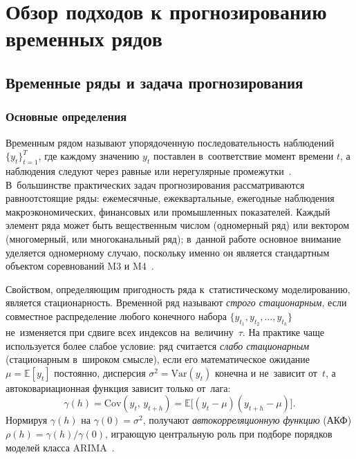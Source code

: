 
\section{Обзор подходов к прогнозированию временных рядов}
\label{sec:theory}

\subsection{Временные ряды и задача прогнозирования}
\label{subsec:ts-problem}

\subsubsection{Основные определения}
\label{sssec:ts-intro}

Временным рядом называют упорядоченную последовательность наблюдений
$\{y_t\}_{t=1}^{T}$, где каждому значению $y_t$ поставлен в~соответствие
момент времени $t$, а наблюдения следуют через равные или нерегулярные
промежутки~\cite{hamilton1994time}.  В~большинстве практических задач
прогнозирования рассматриваются равноотстоящие ряды: ежемесячные,
ежеквартальные, ежегодные наблюдения макроэкономических, финансовых или
промышленных показателей.  Каждый элемент ряда может быть вещественным
числом (одномерный ряд) или вектором (многомерный, или многоканальный
ряд); в~данной работе основное внимание уделяется одномерному случаю,
поскольку именно он является стандартным объектом соревнований M3 и
M4~\cite{makridakis2000m3, makridakis2020m4}.

Свойством, определяющим пригодность ряда к~статистическому
моделированию, является стационарность.  Временной ряд называют
\textit{строго стационарным}, если совместное распределение любого
конечного набора
$\{y_{t_1}, y_{t_2}, \ldots, y_{t_k}\}$
не~изменяется при сдвиге всех индексов на~величину~$\tau$.  На практике
чаще используется более слабое условие: ряд считается \textit{слабо
стационарным} (стационарным в~широком смысле), если его математическое
ожидание $\mu = \mathbb{E}[y_t]$ постоянно, дисперсия
$\sigma^2 = \mathrm{Var}(y_t)$ конечна и не~зависит от~$t$, а
автоковариационная функция зависит только от~лага:
\begin{equation}
\label{eq:autocovariance}
\gamma(h) = \mathrm{Cov}(y_t,\, y_{t+h}) = \mathbb{E}\bigl[(y_t - \mu)(y_{t+h} - \mu)\bigr].
\end{equation}
Нормируя $\gamma(h)$ на $\gamma(0) = \sigma^2$, получают
\textit{автокорреляционную функцию} (АКФ)
$\rho(h) = \gamma(h)/\gamma(0)$, играющую центральную роль
при подборе порядков моделей класса ARIMA~\cite{box1970time}.

